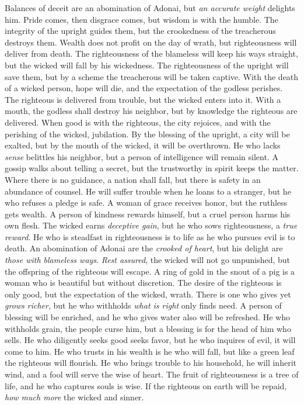 \begin{biblechapter} %
\verse Balances of deceit are an abomination of Adonai, 
but \textit{an accurate weight} delights him.
\verse Pride comes, then disgrace comes, 
but wisdom is with the humble.
\verse The integrity of the upright guides them, 
but the crookedness of the treacherous destroys them.
\verse Wealth does not profit on the day of wrath, 
but righteousness will deliver from death.
\verse The righteousness of the blameless will keep his ways straight, 
but the wicked will fall by his wickedness.
\verse The righteousness of the upright will save them, 
but by a scheme the treacherous will be taken captive.
\verse With the death of a wicked person, hope will die, 
and the expectation of the godless perishes.
\verse The righteous is delivered from trouble, 
but the wicked enters into it.
\verse With a mouth, the godless shall destroy his neighbor, 
but by knowledge the righteous are delivered.
\verse When good is with the righteous, the city rejoices, 
and with the perishing of the wicked, jubilation.
\verse By the blessing of the upright, a city will be exalted, 
but by the mouth of the wicked, it will be overthrown.
\verse He who lacks \textit{sense} belittles his neighbor, 
but a person of intelligence will remain silent.
\verse A gossip walks about telling a secret, 
but the trustworthy in spirit keeps the matter.
\verse Where there is no guidance, a nation shall fall, 
but there is safety in an abundance of counsel.
\verse He will suffer trouble when he loans to a stranger, 
but he who refuses a pledge is safe.
\verse A woman of grace receives honor, 
but the ruthless gets wealth.
\verse A person of kindness rewards himself, 
but a cruel person harms his own flesh.
\verse The wicked earns \textit{deceptive gain}, 
but he who sows righteousness, a \textit{true reward}.
\verse He who is steadfast in righteousness is to life 
as he who pursues evil is to death.
\verse An abomination of Adonai are the \textit{crooked of heart}, 
but his delight are \textit{those with blameless ways}.
\verse \textit{Rest assured}, the wicked will not go unpunished, 
but the offspring of the righteous will escape.
\verse A ring of gold in the snout of a pig 
is a woman who is beautiful but without discretion.
\verse The desire of the righteous is only good, 
but the expectation of the wicked, wrath.
\verse There is one who gives yet \textit{grows richer}, 
but he who withholds \textit{what is right} only finds need.
\verse A person of blessing will be enriched, 
and he who gives water also will be refreshed.
\verse He who withholds grain, the people curse him, 
but a blessing is for the head of him who sells.
\verse He who diligently seeks good seeks favor, 
but he who inquires of evil, it will come to him.
\verse He who trusts in his wealth is he who will fall, 
but like a green leaf the righteous will flourish.
\verse He who brings trouble to his household, he will inherit wind, 
and a fool will serve the wise of heart.
\verse The fruit of righteousness is a tree of life, 
and he who captures souls is wise.
\verse If the righteous on earth will be repaid, 
\textit{how much more} the wicked and sinner.
\end{biblechapter}

